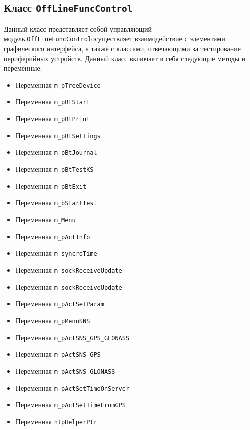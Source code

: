\subsection{Класс \texttt{OffLineFuncControl}}
Данный класс представляет собой управляющий модуль.\break \texttt{OffLineFuncControl}осуществляет взаимодействие с элементами графического
интерфейса, а также с классами, отвечающими за тестирование периферийных устройств.
Данный класс включает в себя следующие методы и переменные:
\begin{itemize}
	\item Переменная \texttt{m\_pTreeDevice}
	\item Переменная \texttt{m\_pBtStart}
	\item Переменная \texttt{m\_pBtPrint}
	\item Переменная \texttt{m\_pBtSettings}
	\item Переменная \texttt{m\_pBtJournal}
	\item Переменная \texttt{m\_pBtTestKS}
	\item Переменная \texttt{m\_pBtExit}

	\item Переменная \texttt{m\_bStartTest}
	\item Переменная \texttt{m\_Menu}
	\item Переменная \texttt{m\_pActInfo}

	\item Переменная \texttt{m\_syncroTime}

	\item Переменная \texttt{m\_sockReceiveUpdate}

	\item Переменная \texttt{m\_sockReceiveUpdate}

	\item Переменная \texttt{m\_pActSetParam}
	\item Переменная \texttt{m\_pMenuSNS}
	\item Переменная \texttt{m\_pActSNS\_GPS\_GLONASS}
	\item Переменная \texttt{m\_pActSNS\_GPS}
	\item Переменная \texttt{m\_pActSNS\_GLONASS}

	\item Переменная \texttt{m\_pActSetTimeOnServer}
	\item Переменная \texttt{m\_pActSetTimeFromGPS}

	\item Переменная \texttt{ntpHelperPtr}


\end{itemize}

